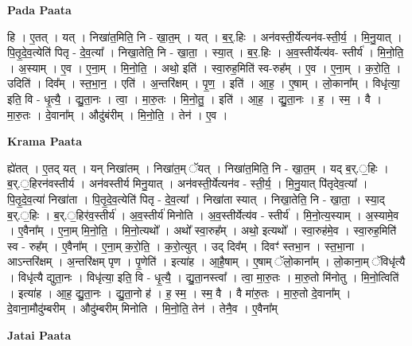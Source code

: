 \documentclass[17pt]{extarticle}
\begin{document}
\textbf{Pada Paata} \newline

हि । ए॒तत् । यत् । निखा॑त॒मिति॒ नि - खा॒त॒म् । यत् । ब॒र्॒.हिः । अन॑वस्ती॒र्येत्यन॑व-स्ती॒र्य॒ । मि॒नु॒यात् । पि॒तृ॒दे॒व॒त्येति॑ पितृ - दे॒व॒त्या᳚ । निखा॒तेति॒ नि - खा॒ता॒ । स्या॒त् । ब॒र॒.हिः । अ॒व॒स्तीर्येत्य॑व- स्तीर्य॑ । मि॒नो॒ति॒ । अ॒स्याम् । ए॒व । ए॒ना॒म् । मि॒नो॒ति॒ । अथो॒ इति॑ । स्वा॒रुह॒मिति॑ स्व-रुह᳚म् । ए॒व । ए॒ना॒म् । क॒रो॒ति॒ । उदिति॑ । दिव᳚म् । स्त॒भा॒न॒ । एति॑ । अ॒न्तरि॑क्षम् । पृ॒ण॒ । इति॑ । आ॒ह॒ । ए॒षाम् । लो॒काना᳚म् । विधृ॑त्या॒ इति॒ वि - धृ॒त्यै॒ । द्यु॒ता॒नः । त्वा॒ । मा॒रु॒तः । मि॒नो॒तु॒ । इति॑ । आ॒ह॒ । द्यु॒ता॒नः । ह॒ । स्म॒ । वै । मा॒रु॒तः । दे॒वाना᳚म् । औदु॑बंरीम् । मि॒नो॒ति॒ । तेन॑ । ए॒व ।  \newline


\textbf{Krama Paata} \newline

ह्ये॑तत् । ए॒तद् यत् । यन् निखा॑तम् । निखा॑त॒म् ॅयत् । निखा॑त॒मिति॒ नि - खा॒त॒म् । यद् ब॒र्.॒हिः । ब॒र्.॒हिरन॑वस्तीर्य । अन॑वस्तीर्य मिनु॒यात् । अन॑वस्ती॒र्येत्यन॑व - स्ती॒र्य॒ । मि॒नु॒यात् पि॑तृदेव॒त्या᳚ । पि॒तृ॒दे॒व॒त्या॑ निखा॑ता । पि॒तृ॒दे॒व॒त्येति॑ पितृ - दे॒व॒त्या᳚ । निखा॑ता स्यात् । निखा॒तेति॒ नि - खा॒ता॒ । स्या॒द् ब॒र्.॒हिः । ब॒र्.॒हिर॑व॒स्तीर्य॑ । अ॒व॒स्तीर्य॑ मिनोति । अ॒व॒स्तीर्येत्य॑व - स्तीर्य॑ । मि॒नो॒त्य॒स्याम् । अ॒स्यामे॒व । ए॒वैना᳚म् । ए॒ना॒म् मि॒नो॒ति॒ । मि॒नो॒त्यथो᳚ । अथो᳚ स्वा॒रुह᳚म् । अथो॒ इत्यथो᳚ । स्वा॒रुह॑मे॒व । स्वा॒रुह॒मिति॑ स्व - रुह᳚म् । ए॒वैना᳚म् । ए॒ना॒म् क॒रो॒ति॒ । क॒रो॒त्युत् । उद् दिव᳚म् । दिवꣳ॑ स्तभा॒न । स्त॒भा॒ना । आऽन्तरि॑क्षम् । अ॒न्तरि॑क्षम् पृण । पृ॒णेति॑ । इत्या॑ह । आ॒है॒षाम् । ए॒षाम् ॅलो॒काना᳚म् । लो॒काना॒म् ॅविधृ॑त्यै । विधृ॑त्यै द्युता॒नः । विधृ॑त्या॒ इति॒ वि - धृ॒त्यै॒ । द्यु॒ता॒नस्त्वा᳚ । त्वा॒ मा॒रु॒तः । मा॒रु॒तो मि॑नोतु । मि॒नो॒त्विति॑ । इत्या॑ह । आ॒ह॒ द्यु॒ता॒नः । द्यु॒ता॒नो ह॑ । ह॒ स्म॒ । स्म॒ वै । वै मा॑रु॒तः । मा॒रु॒तो दे॒वाना᳚म् । दे॒वाना॒मौदु॑म्बरीम् । औदु॑म्बरीम् मिनोति । मि॒नो॒ति॒ तेन॑ । तेनै॒व । ए॒वैना᳚म् \newline

\textbf{Jatai Paata} \newline
\end{document}
